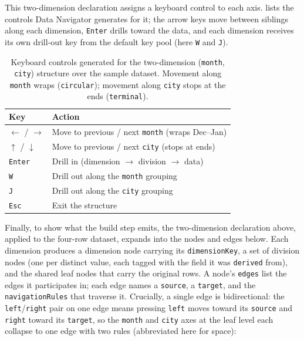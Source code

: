 \documentclass[12pt]{cmuthesis}
\begin{document}
\noindent This two-dimension declaration assigns a keyboard control to each axis.  lists the controls Data Navigator generates for it; the arrow keys move between siblings along each dimension, \texttt{Enter} drills toward the data, and each dimension receives its own drill-out key from the default key pool (here \texttt{W} and \texttt{J}).

\begin{table}[h]
  \centering
  \caption{Keyboard controls generated for the two-dimension (\texttt{month}, \texttt{city}) structure over the sample dataset. Movement along \texttt{month} wraps (\texttt{circular}); movement along \texttt{city} stops at the ends (\texttt{terminal}).}
  \label{tab:keys}
  \begin{tabular}{@{}ll@{}}
    \toprule
    Key & Action \\
    \midrule
    \texttt{$\leftarrow$} / \texttt{$\rightarrow$} & Move to previous / next \texttt{month} (wraps Dec--Jan) \\
    \texttt{$\uparrow$} / \texttt{$\downarrow$} & Move to previous / next \texttt{city} (stops at ends) \\
    \texttt{Enter} & Drill in (dimension $\rightarrow$ division $\rightarrow$ data) \\
    \texttt{W} & Drill out along the \texttt{month} grouping \\
    \texttt{J} & Drill out along the \texttt{city} grouping \\
    \texttt{Esc} & Exit the structure \\
    \bottomrule
  \end{tabular}
\end{table}

\noindent Finally, to show what the build step emits, the two-dimension declaration above, applied to the four-row dataset, expands into the nodes and edges below. Each dimension produces a dimension node carrying its \texttt{dimensionKey}, a set of division nodes (one per distinct value, each tagged with the field it was \texttt{derived} from), and the shared leaf nodes that carry the original rows. A node's \texttt{edges} list the edges it participates in; each edge names a \texttt{source}, a \texttt{target}, and the \texttt{navigationRules} that traverse it. Crucially, a single edge is bidirectional: the \texttt{left}/\texttt{right} pair on one edge means pressing \texttt{left} moves toward its \texttt{source} and \texttt{right} toward its \texttt{target}, so the \texttt{month} and \texttt{city} axes at the leaf level each collapse to one edge with two rules (abbreviated here for space):
\end{document}
